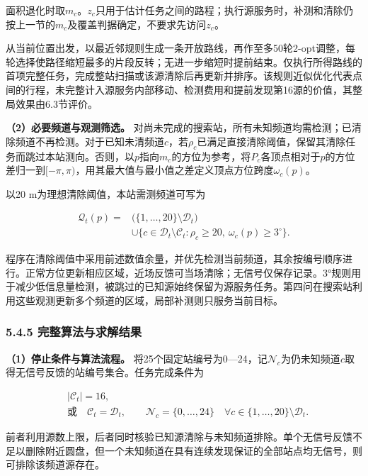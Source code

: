 \documentclass[UTF8,fontset=none,zihao=-4,a4paper]{ctexart}
\begin{document}
面积退化时取\(m_c\)。\(z_c\)只用于估计任务之间的路程；执行源服务时，补测和清除仍按上一节的\(m_c\)及覆盖判据确定，不要求先访问\(z_c\)。

从当前位置出发，以最近邻规则生成一条开放路线，再作至多50轮2-opt调整，每轮选择使路径缩短最多的片段反转；无进一步缩短时提前结束。仅执行所得路线的首项完整任务，完成整站扫描或该源清除后再更新并排序。该规则近似优化代表点间的行程，未完整计入源服务内部移动、检测费用和提前发现第16源的价值，其整局效果由6.3节评价。

\textbf{（2）必要频道与观测筛选。} 对尚未完成的搜索站，所有未知频道均需检测；已清除频道不再检测。对于已知未清频道\(c\)，若\(\rho_c\)已满足直接清除阈值，保留其清除任务而跳过本站测向。否则，以\(p\)指向\(m_c\)的方位为参考，将\(P_c\)各顶点相对于\(p\)的方位差归一到\([-\pi,\pi)\)，用其最大值与最小值之差定义顶点方位跨度\(\omega_c(p)\)。

以20 m为理想清除阈值，本站需测频道可写为

\[
\begin{aligned}
\mathcal Q_t(p)={}&\bigl(\{1,\ldots,20\}\setminus\mathcal D_t\bigr)\\
&\cup\{c\in\mathcal D_t\setminus\mathcal C_t:
\rho_c\ge20,\ \omega_c(p)\ge3^\circ\}.
\end{aligned}
\]

程序在清除阈值中采用前述数值余量，并优先检测当前频道，其余按编号顺序进行。正常方位更新相应区域，近场反馈可当场清除；无信号仅保存记录。3°规则用于减少低信息量检测，被跳过的已知源始终保留为源服务任务。第四问在搜索站利用这些观测更新多个频道的区域，局部补测则只服务当前目标。

\subsubsection{5.4.5 完整算法与求解结果}\label{ux5b8cux6574ux7b97ux6cd5ux4e0eux6c42ux89e3ux7ed3ux679c}

\textbf{（1）停止条件与算法流程。} 将25个固定站编号为0---24，记\(\mathcal N_c\)为仍未知频道\(c\)取得无信号反馈的站编号集合。任务完成条件为

\[
\begin{aligned}
&|\mathcal C_t|=16,\\
&\text{或}\quad \mathcal C_t=\mathcal D_t,\qquad
\mathcal N_c=\{0,\ldots,24\}\quad
\forall c\in\{1,\ldots,20\}\setminus\mathcal D_t.
\end{aligned}
\]

前者利用源数上限，后者同时核验已知源清除与未知频道排除。单个无信号反馈不足以删除附近圆盘，但一个未知频道在具有连续发现保证的全部站点均无信号，则可排除该频道源存在。
\end{document}
